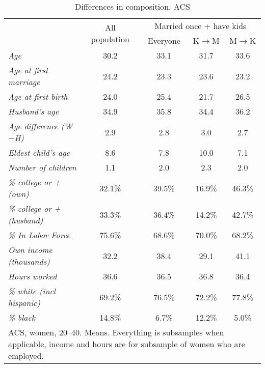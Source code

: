 \documentclass[12pt,letter]{article}
\begin{document}
\begin{table}[h!]
\begin{center}\small
\begin{tabular}{|l|c|c|c|c|}\cline{2-5}
\multicolumn{1}{c|}{} & \multirow{2}{*}{All population} & \multicolumn{3}{c|}{Married once + have kids}\\\cline{3-5}
\multicolumn{1}{c|}{}  & & Everyone & K$\to$M & M$\to$K \\\cline{2-5}\hline
\textit{Age} & 30.2    &  33.1     &       31.7     &       33.6 \\
\textit{Age at first marriage} & 24.2         &   23.3        &    23.6        &    23.2 \\
\textit{Age at first birth}  & 24.0       &     25.4     &       21.7       &     26.5 \\
\textit{Husband's age} & 34.9        &    35.8      &      34.4   &         36.2  \\
\textit{Age difference (W$-$H)} &  2.9       &      2.8      &       3.0      &       2.7  \\\hline\hline
\textit{Eldest child's age} & 8.6         &    7.8    &        10.0     &        7.1 \\
\textit{Number of children} & 1.1       &      2.0      &       2.3     &       2.0 \\\hline\hline
\textit{\% college or + (own)} & 32.1\%   &         39.5\%     &       16.9\%     &       46.3\% \\
\textit{\% college or + (husband)} & 33.3\%     &       36.4\%     &       14.2\%       &     42.7\% \\\hline\hline
\textit{\% In Labor Force} & 75.6\%    &        68.6\%    &        70.0\%        &    68.2\% \\
\textit{Own income (thousands)} & 32.2 &         38.4 &          29.1 &         41.1 \\
\textit{Hours worked} & 36.6       &     36.5    &        36.8        &    36.4\\\hline\hline
\textit{\% white (incl hispanic)} & 69.2\%      &      76.5\%      &      72.2\%      &      77.8\% \\
\textit{\% black} & 14.8\% &        6.7\% &            12.2\%       &       5.0\% \\\hline
\multicolumn{5}{|p{0.7\linewidth}|}{\footnotesize ACS, women, 20--40. Means. Everything is subsamples when applicable, income and hours are for subsample of women who are employed.}\\\hline
\end{tabular}
\caption{Differences in composition, ACS\label{diff-comp}}
\end{center}
\end{table}
\end{document}
